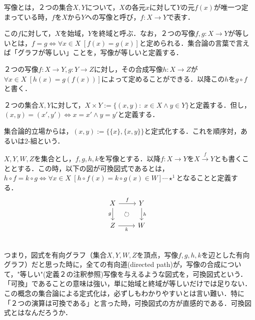 \documentclass[uplatex, 12pt, a4paper, dvipdfmx]{jsarticle}
\begin{document}
\begin{shadebox}\begin{definition}[写像とその相等]写像とは，２つの集合$X,Y$について，$X$の各元$x$に対して$Y$の元$f(x)$が唯一つ定まっている時，$f$を$X$から$Y$への写像と呼び，$f:X\longrightarrow Y$で表す．\end{definition}
この$f$に対して，$X$を始域，$Y$を終域と呼ぶ．なお，２つの写像$f,g:X\longrightarrow Y$が等しいとは，$f=g\Longleftrightarrow \forall x \in X \; [f(x)=g(x)]$と定められる．集合論の言葉で言えば「グラフが等しい」ことを，写像が等しいと定義する．
\begin{definition}[写像の合成]２つの写像$f:X\longrightarrow Y, g:Y\longrightarrow Z$に対し，その合成写像$h:X\longrightarrow Z$が$\forall x \in X \; [h(x)=g(f(x))]$によって定めることができる．以降この$h$を$g\circ f$と書く．\end{definition}
\begin{definition}[集合の積]２つの集合$X,Y$に対して，$X\times Y:=\{ (x,y) :\; x\in X \wedge y\in Y\}$と定義する．但し，$(x,y)=(x',y')\Longleftrightarrow x=x'\wedge y=y'$と定義する． \end{definition}\end{shadebox}

    集合論的立場からは，$(x,y):=\{\{x\},\{x,y\}\}$と定式化する．これを順序対，あるいは2-組という．

\begin{shadebox}\begin{definition}[写像の可換図式]$X,Y,W,Z$を集合とし，$f,g,h,k$を写像とする．以降$f:X\longrightarrow Y$を$X\xrightarrow{f}Y$とも書くこととする．この時，以下の図が可換図式であるとは，$h\circ f=k\circ g \Longleftrightarrow \forall x\in X \; [h\circ f(x)=k\circ g(x) \in W]\cdots\star^1$となることと定義する．
    $$ \begin{tikzcd}
        X \arrow[r, "f"] \arrow[d, "g"'] \arrow[dr, phantom, "\circlearrowright"] &  Y \arrow[d, "h"] \\
            Z \arrow[r, "k"'] &    W \\
    \end{tikzcd} $$
\end{definition}\end{shadebox}
つまり，図式を有向グラフ（集合$X,Y,W,Z$を頂点，写像$f,g,h,k$を辺とした有向グラフ）だと思った時に，全ての有向道(directed path)が，写像の合成について，"等しい"(定義２の注釈参照)写像を与えるような図式を，可換図式という．「可換」であることの意味は強い，単に始域と終域が等しいだけでは足りない．\\
この概念の集合論による定式化は，必ずしもわかりやすいとは言い難い．特に「２つの演算は可換である」と言った時，可換図式の方が直感的である．可換図式とはなんだろうか．
\end{document}
